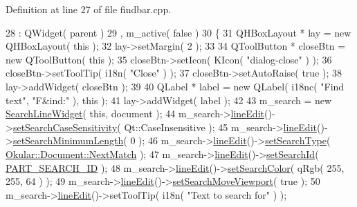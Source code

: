 Definition at line 27 of file findbar.\+cpp.


\begin{DoxyCode}
28   : QWidget( parent )
29   , m\_active( \textcolor{keyword}{false} )
30 \{
31     QHBoxLayout * lay = \textcolor{keyword}{new} QHBoxLayout( \textcolor{keyword}{this} );
32     lay->setMargin( 2 );
33 
34     QToolButton * closeBtn = \textcolor{keyword}{new} QToolButton( \textcolor{keyword}{this} );
35     closeBtn->setIcon( KIcon( \textcolor{stringliteral}{"dialog-close"} ) );
36     closeBtn->setToolTip( i18n( \textcolor{stringliteral}{"Close"} ) );
37     closeBtn->setAutoRaise( \textcolor{keyword}{true} );
38     lay->addWidget( closeBtn );
39 
40     QLabel * label = \textcolor{keyword}{new} QLabel( i18nc( \textcolor{stringliteral}{"Find text"}, \textcolor{stringliteral}{"F&ind:"} ), \textcolor{keyword}{this} );
41     lay->addWidget( label );
42 
43     m\_search = \textcolor{keyword}{new} \hyperlink{classSearchLineWidget}{SearchLineWidget}( \textcolor{keyword}{this}, document );
44     m\_search->\hyperlink{classSearchLineWidget_a8e61338244bd9d2e593a72078d3d7afc}{lineEdit}()->\hyperlink{classSearchLineEdit_a81cd95f5a0bf612d83f4ead3999d926b}{setSearchCaseSensitivity}( Qt::CaseInsensitive );
45     m\_search->\hyperlink{classSearchLineWidget_a8e61338244bd9d2e593a72078d3d7afc}{lineEdit}()->\hyperlink{classSearchLineEdit_a2743adac78c82e7651e68807e88b3cbf}{setSearchMinimumLength}( 0 );
46     m\_search->\hyperlink{classSearchLineWidget_a8e61338244bd9d2e593a72078d3d7afc}{lineEdit}()->\hyperlink{classSearchLineEdit_a8dc6fe77273e78adf9c95c641ef1de2b}{setSearchType}( 
      \hyperlink{classOkular_1_1Document_af4b4b32563d6013d6da10be1667a7badab071628bda8b6bfb432ceae4eaca8792}{Okular::Document::NextMatch} );
47     m\_search->\hyperlink{classSearchLineWidget_a8e61338244bd9d2e593a72078d3d7afc}{lineEdit}()->\hyperlink{classSearchLineEdit_a00ff87a591108a7a3cad4c29b062e9d2}{setSearchId}( \hyperlink{core_2document_8h_aa2f8c7f26fc3ebd32ecd7eda335977cd}{PART\_SEARCH\_ID} );
48     m\_search->\hyperlink{classSearchLineWidget_a8e61338244bd9d2e593a72078d3d7afc}{lineEdit}()->\hyperlink{classSearchLineEdit_ae3ebd6c29d91280797bed839c92b8c82}{setSearchColor}( qRgb( 255, 255, 64 ) );
49     m\_search->\hyperlink{classSearchLineWidget_a8e61338244bd9d2e593a72078d3d7afc}{lineEdit}()->\hyperlink{classSearchLineEdit_a0e5c287135a1105de58f39d413621b8e}{setSearchMoveViewport}( \textcolor{keyword}{true} );
50     m\_search->\hyperlink{classSearchLineWidget_a8e61338244bd9d2e593a72078d3d7afc}{lineEdit}()->setToolTip( i18n( \textcolor{stringliteral}{"Text to search for"} ) );

\end{DoxyCode}
